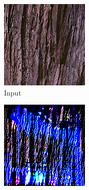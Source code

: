 \begin{figure}[]
\begin{subfigure}{\textwidth}
        \begin{subfigure}{0.19\textwidth}
            \centering
            \includegraphics[width=\textwidth]{images/04-experiment03/staircase_wood_target.jpg}
            \caption{Input}
            \label{fig:ex03-staircase_illum-wood-target}
        \end{subfigure}
        \hfill
        \begin{subfigure}{0.19\textwidth}
            \centering
            \includegraphics[width=\textwidth]{images/04-experiment03/staircase_illum/wood/stats_im.jpg}

\end{subfigure}
\end{subfigure}
\end{figure}
